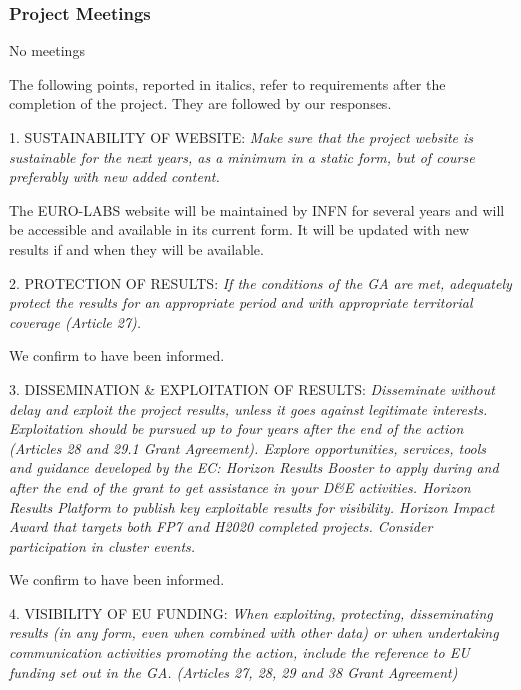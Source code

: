 \subsubsection*{Project Meetings}

No meetings

\begin{prtwo}
\end{prtwo}

The following points, reported in italics, refer to requirements after the completion of the project. They are followed by our responses. 

1. SUSTAINABILITY OF WEBSITE: {\it Make sure that the project website is sustainable for the next years, as a minimum in a static form, but of course preferably with new added content. }

The EURO-LABS website will be maintained by INFN for several years and will be accessible and available in its current form. It will be updated with new results if and when they will be available. 

2. PROTECTION OF RESULTS: {\it If the conditions of the GA are met, adequately protect the results for an appropriate period and with appropriate territorial coverage (Article 27). }

We confirm to have been informed.

3. DISSEMINATION \& EXPLOITATION OF RESULTS: {\it Disseminate without delay and exploit the project results, unless it goes against legitimate interests. Exploitation should be pursued up to four years after the end of the action (Articles 28 and 29.1 Grant Agreement). Explore opportunities, services, tools and guidance developed by the EC: Horizon Results Booster to apply during and after the end of the grant to get assistance in your D\&E activities. Horizon Results Platform to publish key exploitable results for visibility. Horizon Impact Award that targets both FP7 and H2020 completed projects. Consider participation in cluster events. }

We confirm to have been informed.

4. VISIBILITY OF EU FUNDING: {\it When exploiting, protecting, disseminating results (in any form, even when combined with other data) or when undertaking communication activities promoting the action, include the reference to EU funding set out in the GA. (Articles 27, 28, 29 and 38 Grant Agreement) }

